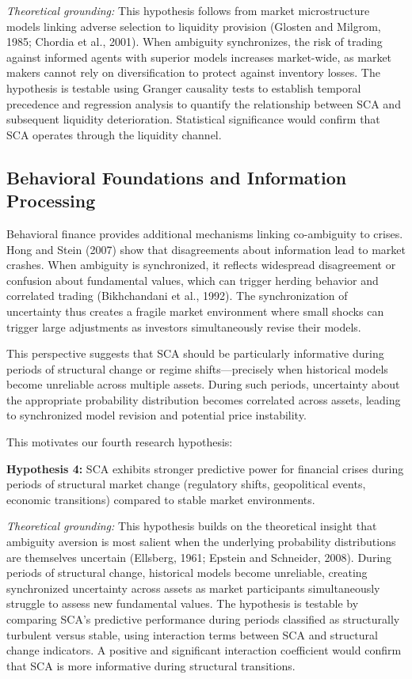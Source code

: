 \documentclass[preprint,12pt,authoryear]{elsarticle}
\begin{document}
\noindent
\textit{Theoretical grounding:} This hypothesis follows from market microstructure models linking adverse selection to liquidity provision (Glosten and Milgrom, 1985; Chordia et al., 2001). When ambiguity synchronizes, the risk of trading against informed agents with superior models increases market-wide, as market makers cannot rely on diversification to protect against inventory losses. The hypothesis is testable using Granger causality tests to establish temporal precedence and regression analysis to quantify the relationship between SCA and subsequent liquidity deterioration. Statistical significance would confirm that SCA operates through the liquidity channel.

\subsection{Behavioral Foundations and Information Processing}

Behavioral finance provides additional mechanisms linking co-ambiguity to crises. Hong and Stein (2007) show that disagreements about information lead to market crashes. When ambiguity is synchronized, it reflects widespread disagreement or confusion about fundamental values, which can trigger herding behavior and correlated trading (Bikhchandani et al., 1992). The synchronization of uncertainty thus creates a fragile market environment where small shocks can trigger large adjustments as investors simultaneously revise their models.

This perspective suggests that SCA should be particularly informative during periods of structural change or regime shifts—precisely when historical models become unreliable across multiple assets. During such periods, uncertainty about the appropriate probability distribution becomes correlated across assets, leading to synchronized model revision and potential price instability.

This motivates our fourth research hypothesis:

\begin{center}
\textbf{Hypothesis 4:} SCA exhibits stronger predictive power for financial crises during periods of structural market change (regulatory shifts, geopolitical events, economic transitions) compared to stable market environments.
\end{center}

\noindent
\textit{Theoretical grounding:} This hypothesis builds on the theoretical insight that ambiguity aversion is most salient when the underlying probability distributions are themselves uncertain (Ellsberg, 1961; Epstein and Schneider, 2008). During periods of structural change, historical models become unreliable, creating synchronized uncertainty across assets as market participants simultaneously struggle to assess new fundamental values. The hypothesis is testable by comparing SCA's predictive performance during periods classified as structurally turbulent versus stable, using interaction terms between SCA and structural change indicators. A positive and significant interaction coefficient would confirm that SCA is more informative during structural transitions.
\end{document}
